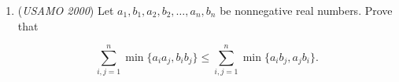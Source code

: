 \begin{enumerate}
	\item (\textit{USAMO 2000}) Let $a_1, b_1, a_2, b_2, \dots , a_n, b_n$ be nonnegative real numbers. Prove that


 
 \[\sum_{i, j = 1}^{n} \min\{a_ia_j, b_ib_j\} \le \sum_{i, j = 1}^{n} \min\{a_ib_j, a_jb_i\}.\]


\end{enumerate}